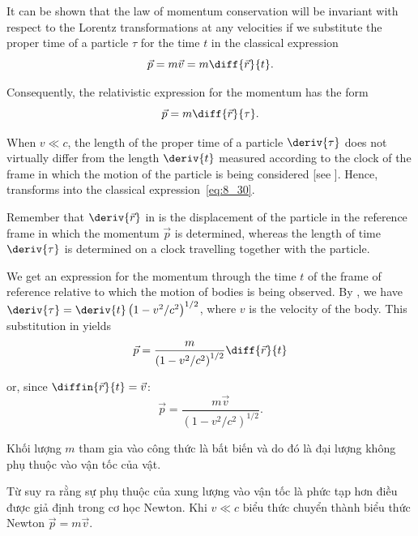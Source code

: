 It can be shown that the law of momentum conservation will be invariant with respect to the Lorentz transformations at any velocities if we substitute the proper time of a particle $\tau$ for the time $t$ in the classical expression
\begin{equation}\label{eq:8_30}
	\vec{p} = m\vec{v} = m\diff{\vec{r}}{t}.
\end{equation}

\noindent
Consequently, the relativistic expression for the momentum has the form
\begin{equation}\label{eq:8_31}
	\vec{p} = m\diff{\vec{r}}{\tau}.
\end{equation}

\noindent
When $v\ll c$, the length of the proper time of a particle $\deriv{\tau}$ does not virtually differ from the length $\deriv{t}$ measured according to the clock of the frame in which the motion of the particle is being considered [see ]. Hence,  transforms into the classical expression~\eqref{eq:8_30}.

Remember that $\deriv{\vec{r}}$ in  is the displacement of the particle in the reference frame in which the momentum $\vec{p}$ is determined, whereas the length of time $\deriv{\tau}$ is determined on a clock travelling together with the particle.

We get an expression for the momentum through the time $t$ of the frame of reference relative to which the motion of bodies is being observed. By , we have $\deriv{\tau}=\deriv{t}\left(1-v^2/c^2\right)^{1/2}$, where $v$ is the velocity of the body. This substitution in  yields
\begin{equation*}
	\vec{p} = \frac{m}{\left(1-v^2/c^2\right)^{1/2}}\diff{\vec{r}}{t}
\end{equation*}

\noindent
or, since $\diffin{\vec{r}}{t}=\vec{v}$:
\begin{equation}\label{eq:8_32}
	\vec{p} = \frac{m\vec{v}}{\left(1-v^2/c^2\right)^{1/2}}.
\end{equation}

Khối lượng $m$ tham gia vào công thức  là bất biến và do đó là đại lượng không phụ thuộc vào vận tốc của vật.

Từ  suy ra rằng sự phụ thuộc của xung lượng vào vận tốc là phức tạp hơn điều được giả định trong cơ học Newton. Khi $v\ll c$ biểu thức  chuyển thành biểu thức Newton $\vec{p}=m\vec{v}$.

